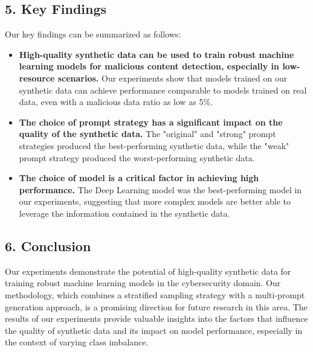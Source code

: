 \documentclass{article}
\begin{document}
\subsection*{5. Key Findings}

Our key findings can be summarized as follows:

\begin{itemize}
    \item \textbf{High-quality synthetic data can be used to train robust machine learning models for malicious content detection, especially in low-resource scenarios.} Our experiments show that models trained on our synthetic data can achieve performance comparable to models trained on real data, even with a malicious data ratio as low as 5\%.
    \item \textbf{The choice of prompt strategy has a significant impact on the quality of the synthetic data.} The "original" and "strong" prompt strategies produced the best-performing synthetic data, while the "weak" prompt strategy produced the worst-performing synthetic data.
    \item \textbf{The choice of model is a critical factor in achieving high performance.} The Deep Learning model was the best-performing model in our experiments, suggesting that more complex models are better able to leverage the information contained in the synthetic data.
\end{itemize}

\subsection*{6. Conclusion}

Our experiments demonstrate the potential of high-quality synthetic data for training robust machine learning models in the cybersecurity domain. Our methodology, which combines a stratified sampling strategy with a multi-prompt generation approach, is a promising direction for future research in this area. The results of our experiments provide valuable insights into the factors that influence the quality of synthetic data and its impact on model performance, especially in the context of varying class imbalance.
\end{document}
